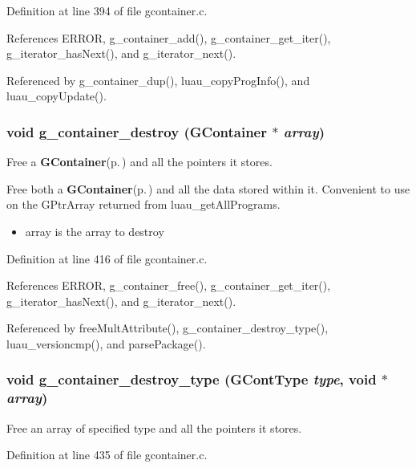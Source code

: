 Definition at line 394 of file gcontainer.c.

References ERROR, g\_\-container\_\-add(), g\_\-container\_\-get\_\-iter(), g\_\-iterator\_\-has\-Next(), and g\_\-iterator\_\-next().

Referenced by g\_\-container\_\-dup(), luau\_\-copy\-Prog\-Info(), and luau\_\-copy\-Update().
\subsubsection{\setlength{\rightskip}{0pt plus 5cm}void g\_\-container\_\-destroy ({\bf GContainer} $\ast$ {\em array})}\label{gcontainer_8c_a22}


Free a {\bf GContainer}{\rm (p.\,\pageref{structGContainer})} and all the pointers it stores. 

Free both a {\bf GContainer}{\rm (p.\,\pageref{structGContainer})} and all the data stored within it. Convenient to use on the GPtr\-Array returned from luau\_\-get\-All\-Programs.

\begin{itemize}
\item array is the array to destroy \end{itemize}


Definition at line 416 of file gcontainer.c.

References ERROR, g\_\-container\_\-free(), g\_\-container\_\-get\_\-iter(), g\_\-iterator\_\-has\-Next(), and g\_\-iterator\_\-next().

Referenced by free\-Mult\-Attribute(), g\_\-container\_\-destroy\_\-type(), luau\_\-versioncmp(), and parse\-Package().
\subsubsection{\setlength{\rightskip}{0pt plus 5cm}void g\_\-container\_\-destroy\_\-type ({\bf GCont\-Type} {\em type}, void $\ast$ {\em array})}\label{gcontainer_8c_a23}


Free an array of specified type and all the pointers it stores. 



Definition at line 435 of file gcontainer.c.

